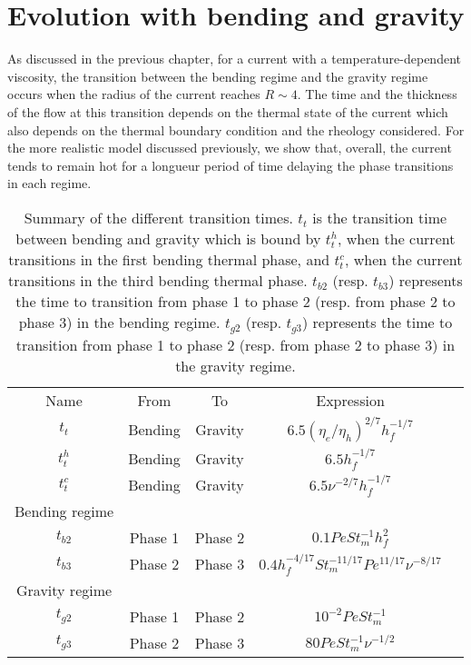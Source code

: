 \section{Evolution with bending and gravity}
\label{sec:evol-with-bend}

As  discussed  in   the  previous  chapter,  for  a   current  with  a
temperature-dependent  viscosity, the  transition between  the bending
regime and  the gravity regime occurs  when the radius of  the current
reaches  $R\sim4$. The  time and  the thickness  of the  flow at  this
transition  depends on  the thermal  state of  the current  which also
depends   on  the   thermal  boundary   condition  and   the  rheology
considered. For the more realistic model discussed previously, we show
that, overall, the  current tends to remain hot for  a longueur period
of time delaying the phase transitions in each regime.


\begin{table}
  \begin{center}
    \begin{tabular}{ccccc}
      Name&From&To&Expression\\
      $t_t$&Bending&Gravity&$6.5(\eta_e/\eta_h)^{2/7}h_f^{-1/7}$\\
      $t_t^h$&Bending&Gravity&$6.5h_f^{-1/7}$\\
      $t_t^c$&Bending&Gravity&$6.5\nu^{-2/7}h_f^{-1/7}$\\
      Bending regime&\multicolumn{3}{c}{} \\
      $t_{b2}$&Phase 1& Phase 2&$0.1 Pe St_m^{-1} h_f^2$\\
      $t_{b3}$&Phase 2& Phase 3 &$0.4 h_f^{-4/17} St_m^{-11/17}Pe^{11/17}\nu^{-8/17}$\\
      Gravity regime&\multicolumn{3}{c}{} \\
      $t_{g2}$ &Phase 1& Phase 2 &$10^{-2}PeSt_m^{-1}$\\
      $t_{g3}$ &Phase 2& Phase 3 &$ 80Pe St_m^{-1}\nu^{-1/2}$\\
    \end{tabular}
    \caption{Summary of the different  transition times.  $t_t$ is the
      transition time  between bending and  gravity which is  bound by
      $t_t^h$,  when  the current  transitions  in  the first  bending
      thermal phase, and $t_t^c$, when  the current transitions in the
      third  bending   thermal  phase.   $t_{b2}$   (resp.   $t_{b3}$)
      represents  the time  to  transition  from phase  1  to phase  2
      (resp. from phase 2 to phase  3) in the bending regime. $t_{g2}$
      (resp. $t_{g3}$) represents the time  to transition from phase 1
      to  phase 2  (resp. from  phase  2 to  phase 3)  in the  gravity
      regime. }
    \label{tab:TimeTransition}
  \end{center}
\end{table}


